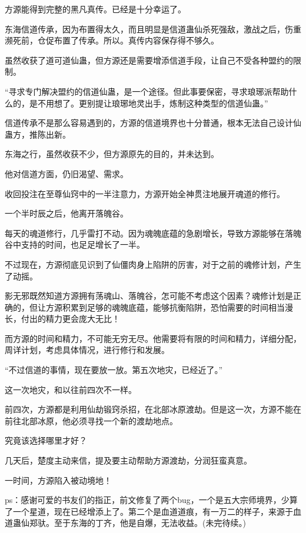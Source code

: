 \begin{this_body}
方源能得到完整的黑凡真传。已经是十分幸运了。

东海信道传承，因为布置得太久，而且明显是信道蛊仙杀死强敌，激战之后，伤重濒死前，仓促布置了传承。所以。真传内容保存得不够久。

虽然收获了道可道仙蛊，但方源还是需要增添信道手段，让自己不受各种盟约的限制。

“寻求专门解决盟约的信道仙蛊，是一个途径。但此事要保密，寻求琅琊派帮助什么的，是不用想了。更别提让琅琊地灵出手，炼制这种类型的信道仙蛊。”

信道传承不是那么容易遇到的，方源的信道境界也十分普通，根本无法自己设计仙蛊方，推陈出新。

东海之行，虽然收获不少，但方源原先的目的，并未达到。

他对信道方面，仍旧渴望、需求。

收回投注在至尊仙窍中的一半注意力，方源开始全神贯注地展开魂道的修行。

一个半时辰之后，他离开落魄谷。

每天的魂道修行，几乎雷打不动。因为魂魄底蕴的急剧增长，导致方源能够在落魄谷中支持的时间，也足足增长了一半。

不过现在，方源彻底见识到了仙僵肉身上陷阱的厉害，对于之前的魂修计划，产生了动摇。

影无邪既然知道方源拥有荡魂山、落魄谷，怎可能不考虑这个因素？魂修计划是正确的，但让方源积累到足够的魂魄底蕴，能够抗衡陷阱，恐怕需要的时间相当漫长，付出的精力更会庞大无比！

而方源的时间和精力，不可能无穷无尽。他需要将有限的时间和精力，详细分配，周详计划，考虑具体情况，进行修行和发展。

“不过信道的事情，现在要放一放。第五次地灾，已经近了。”

这一次地灾，和以往前四次不一样。

前四次，方源都是利用仙劫锻窍杀招，在北部冰原渡劫。但是这一次，方源不能在前往北部冰原，他必须寻找一个新的渡劫地点。

究竟该选择哪里才好？

几天后，楚度主动来信，提及要主动帮助方源渡劫，分润狂蛮真意。

一时间，方源陷入被动境地！

ps：感谢可爱的书友们的指正，前文修复了两个bug，一个是五大宗师境界，少算了一个星道，现在已经增添上了。第二个是血道道痕，有一万二的样子，来源于血道蛊仙郑驮。至于东海的丁齐，他是自爆，无法收益。(未完待续。)

\end{this_body}

